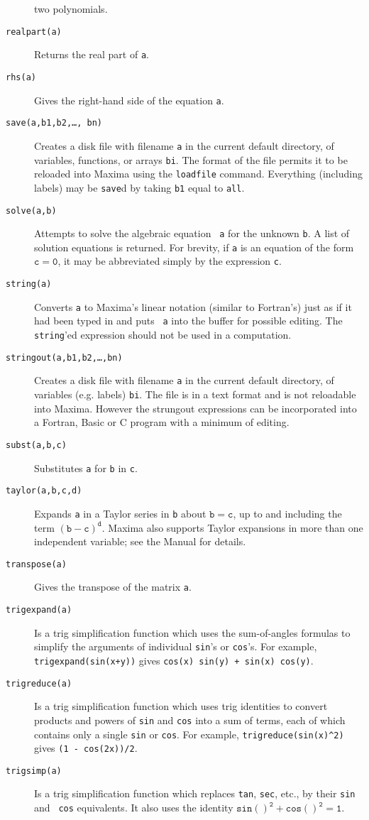 \documentclass[a4paper,12pt]{article}
\begin{document}
\begin{description}
  two polynomials.
\item[{\tt realpart(a)}] Returns the real part of {\tt a}.
\item[{\tt rhs(a)}] Gives the right-hand side of the equation {\tt a}.
\item[{\tt save(a,b1,b2,\ldots, bn)}] Creates a disk file with
  filename {\tt a} in the current default directory, of variables,
  functions, or arrays {\tt bi}.  The format of the file permits it to
  be reloaded into Maxima using the {\tt loadfile} command.
  Everything (including labels) may be {\tt save}d by taking {\tt b1}
  equal to {\tt all}.
\item[{\tt solve(a,b)}] Attempts to solve the algebraic equation {\tt
    a} for the unknown {\tt b}.  A list of solution equations is
  returned.  For brevity, if {\tt a} is an equation of the form
  $\mathtt{c = 0}$, it may be abbreviated simply by the expression
  {\tt c}.
\item[{\tt string(a)}] Converts {\tt a} to Maxima's linear notation
  (similar to Fortran's) just as if it had been typed in and puts {\tt
    a} into the buffer for possible editing.  The {\tt string}'ed
  expression should not be used in a computation.
\item[{\tt stringout(a,b1,b2,\ldots,bn)}] Creates a disk file with
  filename {\tt a} in the current default directory, of variables
  (e.g. labels) {\tt bi}.  The file is in a text format and is not
  reloadable into Maxima. However the strungout expressions can be
  incorporated into a Fortran, Basic or C program with a minimum of
  editing.
\item[{\tt subst(a,b,c)}] Substitutes {\tt a} for {\tt b} in {\tt c}.
\item[{\tt taylor(a,b,c,d)}] Expands {\tt a} in a Taylor series in
  {\tt b} about $\mathtt{b=c}$, up to and including the term
  $\mathtt{(b-c)^d}$.  Maxima also supports Taylor expansions in more
  than one independent variable; see the Manual for details.
\item[{\tt transpose(a)}] Gives the transpose of the matrix {\tt a}.
\item[{\tt trigexpand(a)}] Is a trig simplification function which
  uses the sum-of-angles formulas to simplify the arguments of
  individual {\tt sin}'s or {\tt cos}'s.  For example, {\tt
    trigexpand(sin(x+y))} gives {\tt cos(x) sin(y) + sin(x) cos(y)}.
\item[{\tt trigreduce(a)}] Is a trig simplification function which
  uses trig identities to convert products and powers of {\tt sin} and
  {\tt cos} into a sum of terms, each of which contains only a single
  {\tt sin} or {\tt cos}.  For example, \verb+trigreduce(sin(x)^2)+
  gives {\tt (1 - cos(2x))/2}.
\item[{\tt trigsimp(a)}] Is a trig simplification function which
  replaces {\tt tan}, {\tt sec}, etc., by their {\tt sin} and {\tt
    cos} equivalents.  It also uses the identity $\mathtt{sin()^2 +
    cos()^2 = 1}$.
\end{description}
\end{document}

